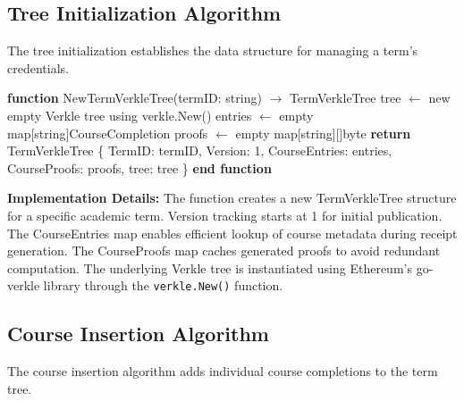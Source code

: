 \subsection{Tree Initialization Algorithm}
\label{subsec:tree-init-algo}

The tree initialization establishes the data structure for managing a term's credentials.

\begin{algorithm}[H]
\caption{NewTermVerkleTree - Initialize Term Tree}
\label{alg:new-term-tree}
\begin{algorithmic}[1]
\STATE \textbf{function} NewTermVerkleTree(termID: string) $\rightarrow$ TermVerkleTree
\STATE \quad tree $\leftarrow$ new empty Verkle tree using verkle.New()
\STATE \quad entries $\leftarrow$ empty map[string]CourseCompletion
\STATE \quad proofs $\leftarrow$ empty map[string][]byte
\STATE \quad \textbf{return} TermVerkleTree \{
\STATE \quad \quad TermID: termID,
\STATE \quad \quad Version: 1,
\STATE \quad \quad CourseEntries: entries,
\STATE \quad \quad CourseProofs: proofs,
\STATE \quad \quad tree: tree
\STATE \quad \}
\STATE \textbf{end function}
\end{algorithmic}
\end{algorithm}

\textbf{Implementation Details:} The function creates a new TermVerkleTree structure for a specific academic term. Version tracking starts at 1 for initial publication. The CourseEntries map enables efficient lookup of course metadata during receipt generation. The CourseProofs map caches generated proofs to avoid redundant computation. The underlying Verkle tree is instantiated using Ethereum's go-verkle library through the \texttt{verkle.New()} function.

\subsection{Course Insertion Algorithm}
\label{subsec:course-insertion-algo}

The course insertion algorithm adds individual course completions to the term tree.

